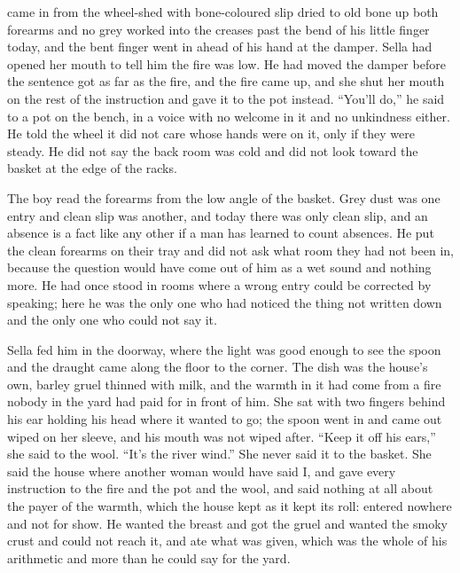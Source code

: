  came in from the wheel-shed with bone-coloured slip dried to old bone up both forearms and no grey worked into the creases past the bend of his little finger today, and the bent finger went in ahead of his hand at the damper. Sella had opened her mouth to tell him the fire was low. He had moved the damper before the sentence got as far as the fire, and the fire came up, and she shut her mouth on the rest of the instruction and gave it to the pot instead. “You'll do,” he said to a pot on the bench, in a voice with no welcome in it and no unkindness either. He told the wheel it did not care whose hands were on it, only if they were steady. He did not say the back room was cold and did not look toward the basket at the edge of the racks.

The boy read the forearms from the low angle of the basket. Grey dust was one entry and clean slip was another, and today there was only clean slip, and an absence is a fact like any other if a man has learned to count absences. He put the clean forearms on their tray and did not ask what room they had not been in, because the question would have come out of him as a wet sound and nothing more. He had once stood in rooms where a wrong entry could be corrected by speaking; here he was the only one who had noticed the thing not written down and the only one who could not say it.

Sella fed him in the doorway, where the light was good enough to see the spoon and the draught came along the floor to the corner. The dish was the house's own, barley gruel thinned with milk, and the warmth in it had come from a fire nobody in the yard had paid for in front of him. She sat with two fingers behind his ear holding his head where it wanted to go; the spoon went in and came out wiped on her sleeve, and his mouth was not wiped after. “Keep it off his ears,” she said to the wool. “It's the river wind.” She never said it to the basket. She said the house where another woman would have said I, and gave every instruction to the fire and the pot and the wool, and said nothing at all about the payer of the warmth, which the house kept as it kept its roll: entered nowhere and not for show. He wanted the breast and got the gruel and wanted the smoky crust and could not reach it, and ate what was given, which was the whole of his arithmetic and more than he could say for the yard.


